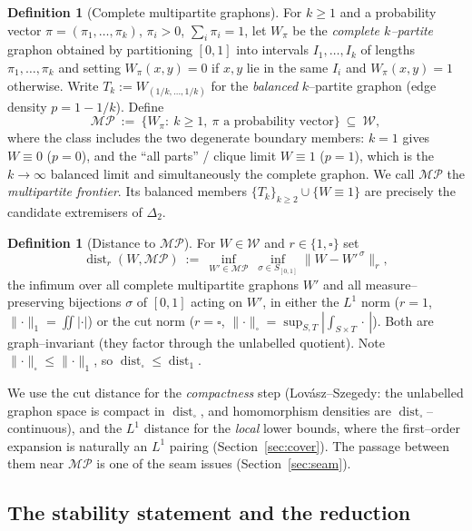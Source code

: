 \documentclass[11pt]{article}
\theoremstyle{definition}
\newtheorem{definition}[theorem]{Definition}
\newcommand{\dist}{\operatorname{dist}}
\newcommand{\MP}{\mathcal{MP}}
\newcommand{\Tk}{T_k}
\newcommand{\cutnorm}[1]{\lVert #1\rVert_\square}
\newcommand{\Lone}[1]{\lVert #1\rVert_1}
\begin{document}
\begin{definition}[Complete multipartite graphons]\label{def:mp}
For $k\ge1$ and a probability vector $\pi=(\pi_1,\dots,\pi_k)$, $\pi_i>0$,
$\sum_i\pi_i=1$, let $W_{\pi}$ be the \emph{complete $k$--partite} graphon obtained
by partitioning $[0,1]$ into intervals $I_1,\dots,I_k$ of lengths $\pi_1,\dots,\pi_k$
and setting $W_\pi(x,y)=0$ if $x,y$ lie in the same $I_i$ and $W_\pi(x,y)=1$
otherwise.  Write $\Tk:=W_{(1/k,\dots,1/k)}$ for the \emph{balanced} $k$--partite
graphon (edge density $p=1-1/k$).  Define
\[
  \MP\ :=\ \Big\{W_\pi:\ k\ge1,\ \pi\text{ a probability vector}\Big\}
  \ \subseteq\ \mathcal W ,
\]
where the class includes the two degenerate boundary members: $k=1$ gives
$W\equiv0$ ($p=0$), and the ``all parts'' / clique limit $W\equiv1$ ($p=1$), which
is the $k\to\infty$ balanced limit and simultaneously the complete graphon.  We
call $\MP$ the \emph{multipartite frontier}.  Its balanced members
$\{\Tk\}_{k\ge2}\cup\{W\equiv1\}$ are precisely the candidate extremisers of
$\Delta_2$.
\end{definition}

\begin{definition}[Distance to $\MP$]\label{def:dist}
For $W\in\mathcal W$ and $r\in\{1,\square\}$ set
\[
  \dist_r(W,\MP)\ :=\ \inf_{W'\in\MP}\ \inf_{\sigma\in S_{[0,1]}}
     \big\lVert W-W'^{\,\sigma}\big\rVert_r ,
\]
the infimum over all complete multipartite graphons $W'$ and all
measure--preserving bijections $\sigma$ of $[0,1]$ acting on $W'$, in either the
$L^1$ norm ($r=1$, $\Lone{\cdot}=\iint|\cdot|$) or the cut norm ($r=\square$,
$\cutnorm{\cdot}=\sup_{S,T}|\int_{S\times T}\cdot\,|$).  Both are graph--invariant
(they factor through the unlabelled quotient).  Note
$\cutnorm{\cdot}\le\Lone{\cdot}$, so $\dist_\square\le\dist_1$.
\end{definition}

We use the cut distance for the \emph{compactness} step (Lov\'asz--Szegedy: the
unlabelled graphon space is compact in $\dist_\square$, and homomorphism densities
are $\dist_\square$--continuous), and the $L^1$ distance for the \emph{local}
lower bounds, where the first--order expansion is naturally an $L^1$ pairing
(Section~\ref{sec:cover}).  The passage between them near $\MP$ is one of the seam
issues (Section~\ref{sec:seam}).

\subsection{The stability statement and the reduction}
\end{document}
